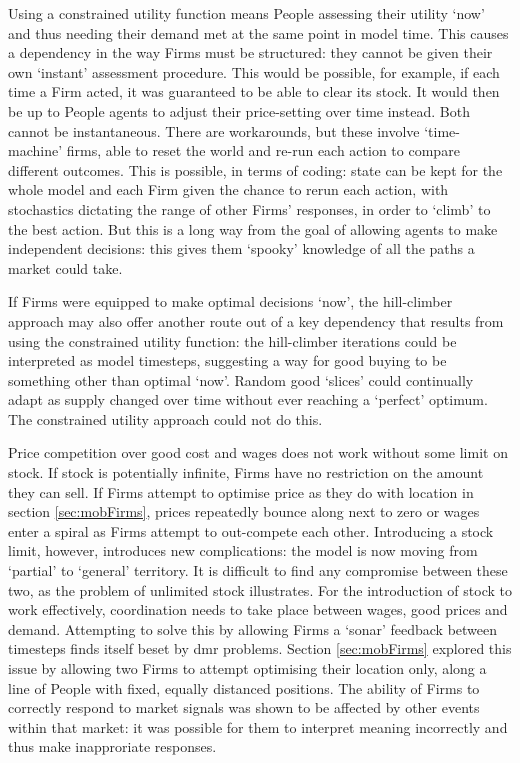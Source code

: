 Using a constrained utility function means People assessing their utility `now' and thus needing their demand met at the same point in model time. This causes a dependency in the way Firms must be structured: they cannot be given their own `instant' assessment procedure. This would be possible, for example, if each time a Firm acted, it was guaranteed to be able to clear its stock. It would then be up to People agents to adjust their price-setting over time instead. Both cannot be instantaneous. There are workarounds, but these involve `time-machine' firms, able to reset the world and re-run each action to compare different outcomes. This is possible, in terms of coding: state can be kept for the whole model and each Firm given the chance to rerun each action, with stochastics dictating the range of other Firms' responses, in order to `climb' to the best action. But this is a long way from the goal of allowing agents to make independent decisions: this gives them `spooky' knowledge of all the paths a market could take. 

If Firms were equipped to make optimal decisions `now', the hill-climber approach may also offer another route out of a key dependency that results from using the constrained utility function: the hill-climber iterations could be interpreted as model timesteps, suggesting a way for good buying to be something other than optimal `now'. Random good `slices' could continually adapt as supply changed over time without ever reaching a `perfect' optimum. The constrained utility approach could not do this.

Price competition over good cost and wages does not work without some limit on stock. If stock is potentially infinite, Firms have no restriction on the amount they can sell. If Firms attempt to optimise price as they do with location in section \ref{sec:mobFirms}, prices repeatedly bounce along next to zero or wages enter a spiral as Firms attempt to out-compete each other. Introducing a stock limit, however, introduces new complications: the model is now moving from `partial' to `general' territory. It is difficult to find any compromise between these two, as the problem of unlimited stock illustrates. For the introduction of stock to work effectively, coordination needs to take place between wages, good prices and demand. Attempting to solve this by allowing Firms a `sonar' feedback between timesteps finds itself beset by \gls{dmr} problems. Section \ref{sec:mobFirms} explored this issue by allowing two Firms to attempt optimising their location only, along a line of People with fixed, equally distanced positions. The ability of Firms to correctly respond to market signals was shown to be affected by other events within that market: it was possible for them to interpret meaning incorrectly and thus make inapproriate responses.

